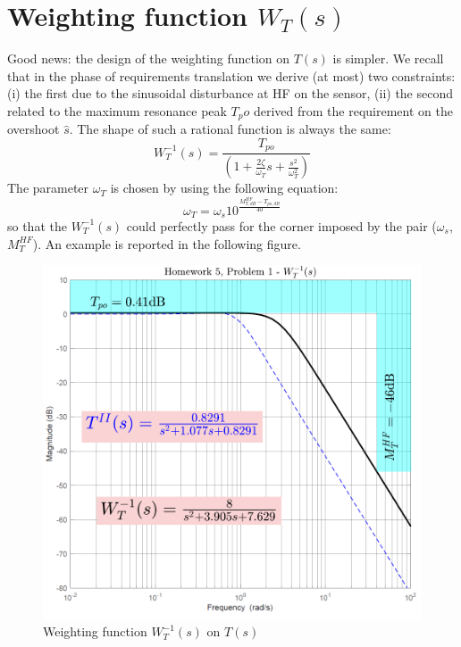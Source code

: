 \documentclass[a4paper, 12pt]{article}
\begin{document}
    \section{Weighting function $W_T(s)$}
    Good news: the design of the weighting function on $T(s)$ is simpler. We recall that in the phase of requirements translation we derive (at most) two constraints: (i) the first due to the sinusoidal disturbance at HF on the sensor, (ii) the second related to the maximum resonance peak $T_po$ derived from the requirement on the overshoot $\hat{s}$. The shape of such a rational function is always the same: 
    \begin{equation}
        W_T^{-1}(s) = \frac{T_{po}}{{(1+\frac{2\zeta}{\omega_T}s+\frac{s^2}{\omega_T^2})}}
    \end{equation}
    The parameter $\omega_T$ is chosen by using the following equation:
    \begin{equation}
        \omega_T=\omega_s 10^{\frac{M_{T,dB}^{HF}-T_{po,dB}}{40}}
    \end{equation} 
    so that the $W_T^{-1}(s)$ could perfectly pass for the corner imposed by the pair ($\omega_s$, $M_T^{HF}$). 
    An example is reported in the following figure.

    \begin{figure}[h]
        \centering
        \includegraphics[scale=0.7]{img/Wt.png}
        \caption{Weighting function $W_T^{-1}(s)$ on $T(s)$}
    \end{figure}
    
\end{document}
